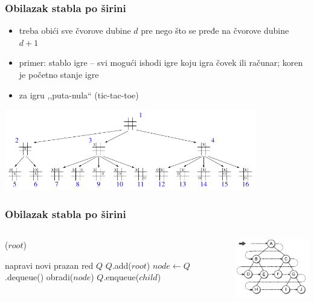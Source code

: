 \documentclass[compress,aspectratio=169]{beamer}
\begin{document}
\begin{frame}[fragile]
\frametitle{Obilazak stabla po širini}
\begin{itemize}
  \item treba obići sve čvorove dubine $d$ pre nego što se pređe na čvorove dubine $d + 1$
  \item primer: stablo igre -- svi mogući ishodi igre koju igra čovek ili računar; koren je početno stanje igre
  \item za igru ,,puta-nula`` (tic-tac-toe)
\end{itemize}
\begin{center}
  \includegraphics[width=11cm]{asp-08-pic05.pdf}
\end{center}
\end{frame}

\begin{frame}[fragile]
\frametitle{Obilazak stabla po širini}
\begin{columns}
  \begin{column}[c]{6cm}
    ($root$)
    \begin{algorithmic}
    \STATE napravi novi prazan red $Q$
    \STATE $Q$.add($root$)
      \STATE $node \leftarrow Q$.dequeue()
      \STATE obradi($node$)
        \STATE $Q$.enqueue($child$)
      \ENDFOR  
    \ENDWHILE
    \end{algorithmic}
  \end{column}
  \begin{column}[c]{5cm}
    \begin{center}
      \includegraphics[width=5cm]{asp-08-pic06.pdf}
    \end{center}
  \end{column}
\end{columns}
\end{frame}
\end{document}
